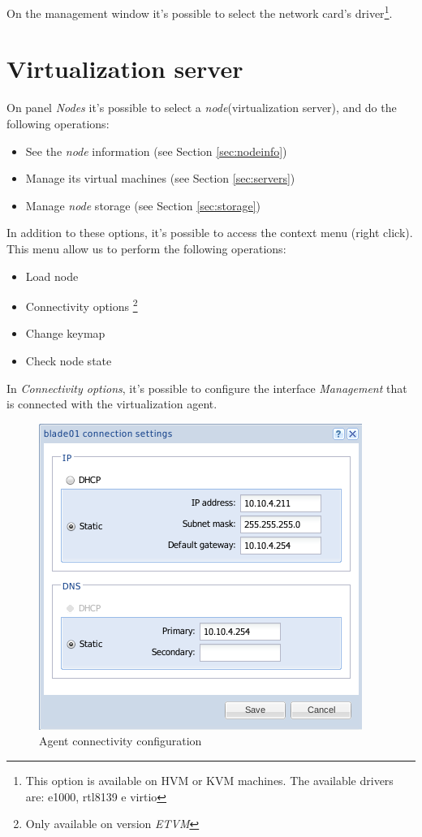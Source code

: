 On the management window it's possible to select the network card's driver\footnote{This option is available on HVM or KVM machines. The available drivers are: e1000, rtl8139 e virtio}.


\section{Virtualization server}
\label{sec:node}

On panel \emph{Nodes} it's possible to select a \emph{node}(virtualization server), and do the following operations:
\begin{itemize}
    \item See the \emph{node} information (see Section \ref{sec:nodeinfo})
    \item Manage its virtual machines (see Section \ref{sec:servers})
    \item Manage \emph{node} storage (see Section  \ref{sec:storage})
\end{itemize}

In addition to these options, it's possible to access the context menu (right click). This menu allow us to perform the following operations:
\begin{itemize}
    \item Load node
    \item Connectivity options \footnote{Only available on version \emph{ETVM}}
    \item Change keymap
    \item Check node state
\end{itemize}

In \emph{Connectivity options}, it's possible to configure the interface \emph{Management} that is connected with the virtualization agent. 
\begin{figure}[H]
	\begin{center}
	\includegraphics[scale=0.5]{screenshots/node_conn.png}
	\caption{Agent connectivity configuration}
	\label{fig:node_conn}
	\end{center}
\end{figure}

